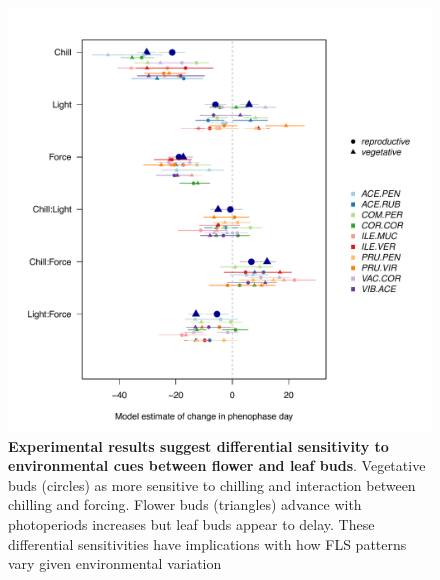 \documentclass[11pt]{article}
\begin{document}
\begin{figure}[h!]
    \centering
         \includegraphics[width=\textwidth]{..//Plots/Flobuds_manuscript_figs/budburstvsflowering.pdf}
    \caption{\textbf{Experimental results suggest differential sensitivity to environmental cues between flower and leaf buds}. Vegetative buds (circles) as more sensitive to chilling and interaction between chilling and forcing. Flower buds (triangles) advance with photoperiods increases but leaf buds appear to delay. These differential sensitivities have implications with how FLS patterns vary given environmental variation}
    \label{fig:model}
\end{figure}
\end{document}
